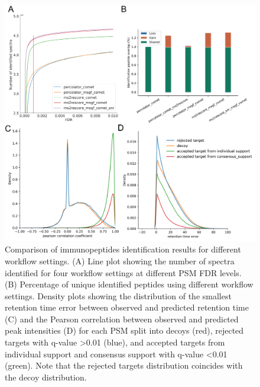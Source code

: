 \documentclass[12pt]{article}
\begin{document}
\begin{figure}[h!]
	\centering
	\includegraphics[width=1\textwidth]{figures//PXD019643.png}
	\caption{Comparison of immunopeptides identification results for different workflow settings. (A) Line plot showing the number of spectra identified for four workflow settings at different PSM FDR levels. (B) Percentage of unique identified peptides using different workflow settings. Density plots showing the distribution of the smallest retention time error between observed and predicted retention time (C) and the Pearson correlation between observed and predicted peak intensities (D) for each PSM split into decoys (red), rejected targets with q-value >0.01 (blue), and accepted targets from individual support and consensus support with q-value <0.01 (green). Note that the rejected targets distribution coincides with the decoy distribution.}
	\label{fig:PXD019643_immunopeptides}
\end{figure}
\end{document}
